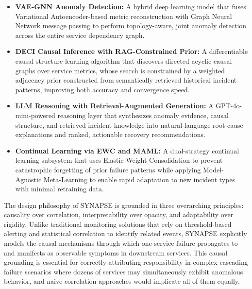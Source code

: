 \begin{itemize}
    \item \textbf{VAE-GNN Anomaly Detection:} A hybrid deep learning model that fuses Variational Autoencoder-based metric reconstruction with Graph Neural Network message passing to perform topology-aware, joint anomaly detection across the entire service dependency graph.
    \item \textbf{DECI Causal Inference with RAG-Constrained Prior:} A differentiable causal structure learning algorithm that discovers directed acyclic causal graphs over service metrics, whose search is constrained by a weighted adjacency prior constructed from semantically retrieved historical incident patterns, improving both accuracy and convergence speed.
    \item \textbf{LLM Reasoning with Retrieval-Augmented Generation:} A GPT-4o-mini-powered reasoning layer that synthesizes anomaly evidence, causal structure, and retrieved incident knowledge into natural-language root cause explanations and ranked, actionable recovery recommendations.
    \item \textbf{Continual Learning via EWC and MAML:} A dual-strategy continual learning subsystem that uses Elastic Weight Consolidation to prevent catastrophic forgetting of prior failure patterns while applying Model-Agnostic Meta-Learning to enable rapid adaptation to new incident types with minimal retraining data.
\end{itemize}

\hspace*{0.3in} The design philosophy of SYNAPSE is grounded in three overarching principles: causality over correlation, interpretability over opacity, and adaptability over rigidity. Unlike traditional monitoring solutions that rely on threshold-based alerting and statistical correlation to identify related events, SYNAPSE explicitly models the causal mechanisms through which one service failure propagates to and manifests as observable symptoms in downstream services. This causal grounding is essential for correctly attributing responsibility in complex cascading failure scenarios where dozens of services may simultaneously exhibit anomalous behavior, and naive correlation approaches would implicate all of them equally.\\\\

